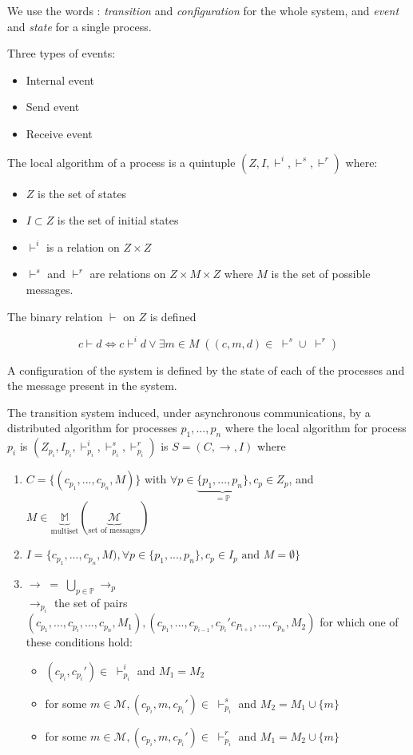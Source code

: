 We use the words : \emph{transition} and \emph{configuration} for the whole system, and \emph{event} and \emph{state} for a single process.

Three types of events:
\begin{itemize}
\item Internal event
\item Send event
\item Receive event
\end{itemize}

\begin{defi}
The local algorithm of a process is a quintuple $(Z,I,\vdash^i,\vdash^s,\vdash^r)$ where:
\begin{itemize}
\item $Z$ is the set of states
\item $I\subset Z$ is the set of initial states\
\item $\vdash^i$ is a relation on $Z\times Z$
\item $\vdash^s$ and $\vdash^r$ are relations on $Z\times M \times Z$ where $M$ is the set of possible messages.
\end{itemize}
The binary relation $\vdash$ on $Z$ is defined 

\[c \vdash d \Leftrightarrow c \vdash^i d \vee \exists m \in M \; ((c,m,d)\in \;\vdash^s \cup \; \vdash^r) \]
\end{defi}

A configuration of the system is defined by the state of each of the processes and the message present in the system.

\begin{defi}
The transition system induced, under asynchronous communications, by a distributed algorithm for processes $p_1, ...,p_n$ where the local algorithm for process $p_i$ is $(Z_{p_i},I_{p_i},\vdash^i_{p_i},\vdash^s_{p_i},\vdash^r_{p_i})$ is $S=(C,\to,I)$ where
\begin{enumerate}
\item $C=\{(c_{p_1},...,c_{p_n},M)\}$ with $\forall p \in \underbrace{\{p_1,...,p_n\}}_{=\mathbb{P}}, c_p\in Z_p$, and $ M \in \underbrace{\mathbb{M}}_{\text{multiset}}(\underbrace{\mathcal{M}}_{\text{set of messages}})$
\item $I=\{ c_{p_1},...,c_{p_n},M), \forall p \in \{ p_1,...,p_n\},  c_p \in I_p \text{ and } M=\emptyset \}$
\item $\to \; = \; \bigcup_{p\in \mathbb{P}} \to_p$\\
$\to_{p_i}$ the set of pairs $(c_{p_1},...,c_{p_i},...,c_{p_n},M_1),(c_{p_1},...,c_{p_{i-1}},c_{p_i}'c_{P_{i+1}},...,c_{p_n},M_2)$ for which one of these conditions hold:
\begin{itemize}
\item $(c_{p_i},c_{p_i}')\in \; \vdash^i_{p_i}$ and $M_1=M_2$
\item for some $m\in \mathcal{M}, (c_{p_i},m,c_{p_i}') \in \;\vdash_{p_i}^s$ and $M_2=M_1 \cup \{m\}$
\item for some $m\in \mathcal{M}, (c_{p_i},m,c_{p_i}') \in \;\vdash_{p_i}^r$ and $M_1=M_2 \cup \{m\}$
\end{itemize}
\end{enumerate}
\end{defi}

